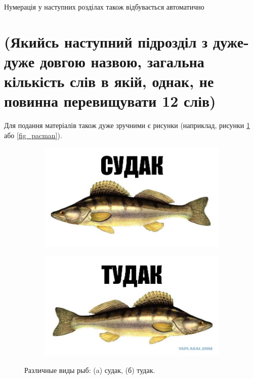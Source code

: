 \begin{theorem}
Нумерація у наступних розділах також відбувається автоматично
\end{theorem}

\section{(Якийсь наступний підрозділ з дуже-дуже довгою назвою, загальна кількість слів в якій, однак, не повинна перевищувати 12 слів)}

Для подання матеріалів також дуже зручними є рисунки (наприклад, рисунки 
\ref{fig_sudak} або \ref{fig_pacman}).

\begin{figure}[ht]
\centering
    \begin{subfigure}[b]{0.5\textwidth}    
        \includegraphics[scale=0.3]{Images/Sudak.png}
        \caption{}
    \end{subfigure}%
    \begin{subfigure}[b]{0.5\textwidth}
        \includegraphics[scale=0.3]{Images/Tudak.png}
        \caption{}
    \end{subfigure}
 
    \caption{Различные виды рыб: (a) судак, (б) тудак.}
    \label{fig_sudak}
\end{figure}

